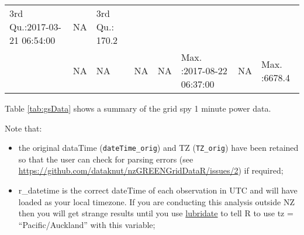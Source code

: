 \documentclass[]{article}
\providecommand{\tightlist}{%
  \setlength{\itemsep}{0pt}\setlength{\parskip}{0pt}}
\theoremstyle{definition}
\theoremstyle{definition}
\theoremstyle{definition}
\theoremstyle{remark}
\begin{document}
\begin{longtable}[]{@{}llllllll@{}}
\begin{minipage}[t]{0.16\columnwidth}
3rd Qu.:2017-03-21 06:54:00\strut
\end{minipage} & \begin{minipage}[t]{0.10\columnwidth}\raggedright\strut
NA\strut
\end{minipage} & \begin{minipage}[t]{0.09\columnwidth}\raggedright\strut
3rd Qu.: 170.2\strut
\end{minipage}\tabularnewline
\begin{minipage}[t]{0.02\columnwidth}\raggedright\strut
\strut
\end{minipage} & \begin{minipage}[t]{0.10\columnwidth}\raggedright\strut
NA\strut
\end{minipage} & \begin{minipage}[t]{0.10\columnwidth}\raggedright\strut
NA\strut
\end{minipage} & \begin{minipage}[t]{0.10\columnwidth}\raggedright\strut
NA\strut
\end{minipage} & \begin{minipage}[t]{0.10\columnwidth}\raggedright\strut
NA\strut
\end{minipage} & \begin{minipage}[t]{0.16\columnwidth}\raggedright\strut
Max. :2017-08-22 06:37:00\strut
\end{minipage} & \begin{minipage}[t]{0.10\columnwidth}\raggedright\strut
NA\strut
\end{minipage} & \begin{minipage}[t]{0.09\columnwidth}\raggedright\strut
Max. :6678.4\strut
\end{minipage}\tabularnewline
\bottomrule
\end{longtable}

Table \ref{tab:gsData} shows a summary of the grid spy 1 minute power
data.

Note that:

\begin{itemize}
\tightlist
\item
  the original dataTime (\texttt{dateTime\_orig}) and TZ
  (\texttt{TZ\_orig}) have been retained so that the user can check for
  parsing errors (see
  \url{https://github.com/dataknut/nzGREENGridDataR/issues/2}) if
  required;
\item
  r\_datetime is the correct dateTime of each observation in UTC and
  will have loaded as your local timezone. If you are conducting this
  analysis outside NZ then you will get strange results until you use
  \href{https://lubridate.tidyverse.org/}{lubridate} to tell R to use tz
  = ``Pacific/Auckland'' with this variable;
\end{itemize}
\end{document}
